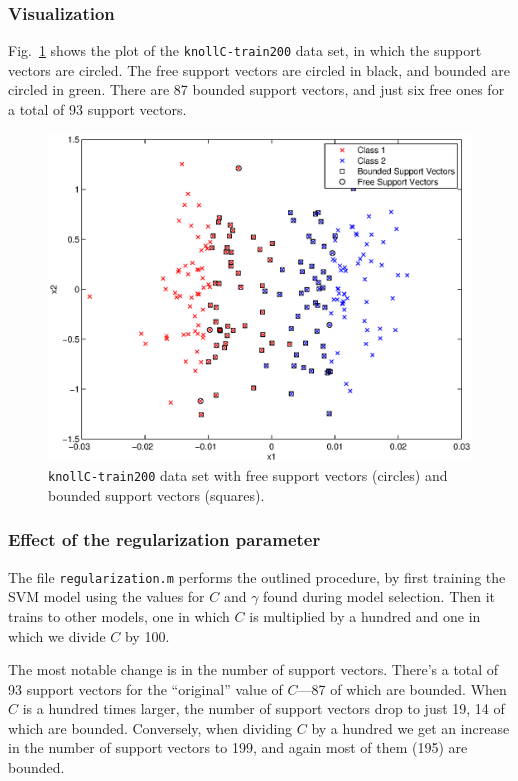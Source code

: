 \documentclass{article}
\begin{document}
\subsubsection{Visualization}

Fig.~\ref{fig:freebounded} shows the plot of the \texttt{knollC-train200} data set, in which the support vectors are circled. The free support vectors are circled in black, and bounded are circled in green. There are 87 bounded support vectors, and just six free ones for a total of 93 support vectors.

\begin{figure}[!ht]
  \centering
  \includegraphics[width=.8\textwidth]{Code/freeBoundedSVs.eps}
  \caption{\texttt{knollC-train200} data set with free support vectors (circles) and bounded support vectors (squares).}
  \label{fig:freebounded}
\end{figure}

\subsubsection{Effect of the regularization parameter}


The file \texttt{regularization.m} performs the outlined procedure, by first training the SVM model using the values for $C$ and $\gamma$ found during model selection. Then it trains to other models, one in which $C$ is multiplied by a hundred and one in which we divide $C$ by 100.

The most notable change is in the number of support vectors. There's a total of 93 support vectors for the ``original'' value of $C$---87 of which are bounded. When $C$ is a hundred times larger, the number of support vectors drop to just 19, 14 of which are bounded. Conversely, when dividing $C$ by a hundred we get an increase in the number of support vectors to 199, and again most of them (195) are bounded.
\end{document}
